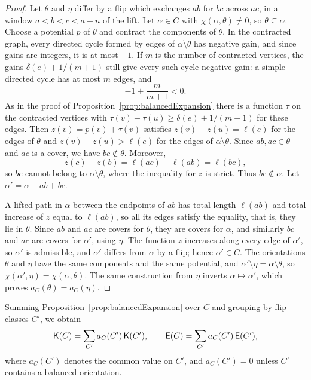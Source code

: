 \begin{proof}
Let $\theta$ and $\eta$ differ by a flip which exchanges $ab$ for $bc$ across
$ac$, in a window $a<b<c<a+n$ of the lift.
Let $\alpha\in C$ with $\chi(\alpha,\theta)\neq0$, so $\theta\subseteq\alpha$.
Choose a potential $p$ of $\theta$ and contract the components of $\theta$.
In the contracted graph, every directed cycle formed by edges of
$\alpha\setminus\theta$ has negative gain, and since gains are integers, it is at
most $-1$.
If $m$ is the number of contracted vertices, the gains $\delta(e)+1/(m+1)$ still
give every such cycle negative gain: a simple directed cycle has at most $m$
edges, and
\[
 -1+\frac{m}{m+1}<0.
\]
As in the proof of
Proposition~\ref{prop:balancedExpansion} there is a function $\tau$ on the
contracted vertices with $\tau(v)-\tau(u)\geq\delta(e)+1/(m+1)$ for these edges.
Then $z(v)=p(v)+\tau(v)$ satisfies $z(v)-z(u)=\ell(e)$ for the edges of $\theta$ and
$z(v)-z(u)>\ell(e)$ for the edges of $\alpha\setminus\theta$.
Since $ab,ac\in\theta$ and $ac$ is a cover, we have $bc\notin\theta$.
Moreover,
\[
 z(c)-z(b)=\ell(ac)-\ell(ab)=\ell(bc),
\]
so $bc$ cannot belong to $\alpha\setminus\theta$, where the inequality for $z$
is strict.
Thus $bc\notin\alpha$.
Let $\alpha'=\alpha-ab+bc$.

A lifted path in $\alpha$ between the endpoints of $ab$ has total length
$\ell(ab)$ and total increase of $z$ equal to $\ell(ab)$, so all its edges satisfy
the equality, that is, they lie in $\theta$.
Since $ab$ and $ac$ are covers for $\theta$, they are covers for $\alpha$, and
similarly $bc$ and $ac$ are covers for $\alpha'$, using $\eta$.
The function $z$ increases along every edge of $\alpha'$, so $\alpha'$ is admissible,
and $\alpha'$ differs from $\alpha$ by a flip; hence $\alpha'\in C$.
The orientations $\theta$ and $\eta$ have the same components and the same
potential, and $\alpha'\setminus\eta=\alpha\setminus\theta$, so
$\chi(\alpha',\eta)=\chi(\alpha,\theta)$.
The same construction from $\eta$ inverts $\alpha\mapsto\alpha'$, which proves
$a_C(\theta)=a_C(\eta)$.
\end{proof}

Summing Proposition~\ref{prop:balancedExpansion} over $C$ and grouping by flip
classes $C'$, we obtain
\begin{equation}\label{eq:grouping}
 \mathsf{K}(C)=\sum_{C'} a_C(C')\,\mathsf{K}(C'),\qquad \mathsf{E}(C)=\sum_{C'} a_C(C')\,\mathsf{E}(C'),
\end{equation}
where $a_C(C')$ denotes the common value on $C'$, and $a_C(C')=0$ unless $C'$
contains a balanced orientation.

